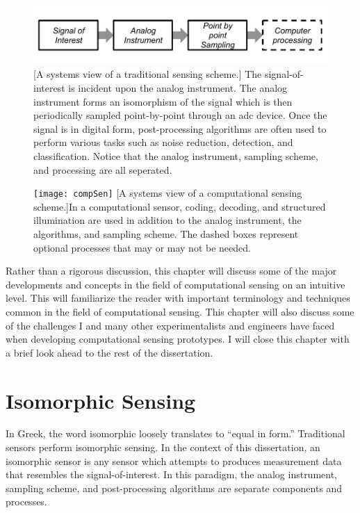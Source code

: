 \begin{figure}
    \centering
    \includegraphics[scale=1]{isomorphicsensorflowchart}
    [A systems view of a traditional sensing scheme.]{ The signal-of-interest is incident upon the analog instrument. The analog instrument forms an isomorphism of the signal which is then periodically sampled point-by-point through an \gls{adc} device. Once the signal is in digital form, post-processing algorithms are often used to perform various tasks such as noise reduction, detection, and classification. Notice that the analog instrument, sampling scheme, and processing are all seperated. }
    \label{fig:isomorphicsesingflowchart}
\end{figure}


\begin{figure}
	\texttt{[image: compSen]}
	[A systems view of a computational sensing scheme.]{In a computational sensor, coding, decoding, and structured illumination are used in addition to the analog instrument, the algorithms, and sampling scheme. The dashed boxes represent optional processes that may or may not be needed. }
	\label{fig:compSen}
\end{figure}

Rather than a rigorous discussion, this chapter will discuss some of the major developments and concepts in the field of computational sensing on an intuitive level. This will familiarize the reader with important terminology and techniques common in the field of computational sensing. This chapter will also discuss some of the challenges I and many other experimentalists and engineers have faced when developing computational sensing prototypes. I will close this chapter with a brief look ahead to the rest of the dissertation. 


\section{Isomorphic Sensing}\label{sec:Isomorphic Sensing}

In Greek, the word isomorphic loosely translates to ``equal in form.'' Traditional sensors perform isomorphic sensing. In the context of this dissertation, an isomorphic sensor is any sensor which attempts to produces measurement data that resembles the signal-of-interest. In this paradigm, the analog instrument, sampling scheme, and post-processing algorithms are separate components and processes.

